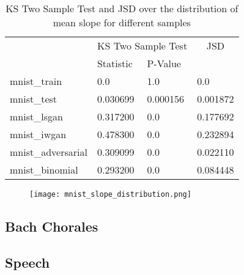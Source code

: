 \begin{table}[!h]
\centering
\caption{KS Two Sample Test and JSD over the distribution of mean slope for
different samples}
\label{tbl:mnist_slope}
\begin{tabular}{l|ll|l|}
                   & \multicolumn{2}{c|}{\cellcolor[HTML]{C0C0C0}KS Two Sample Test} & \multicolumn{1}{c|}{\cellcolor[HTML]{C0C0C0}JSD} \\
                   & Statistic   & P-Value    &            \\
mnist\_train       & 0.0         & 1.0        & 0.0        \\
mnist\_test        & 0.030699    & 0.000156   & 0.001872   \\
mnist\_lsgan       & 0.317200    & 0.0        & 0.177692   \\
mnist\_iwgan       & 0.478300    & 0.0        & 0.232894   \\
mnist\_adversarial & 0.309099    & 0.0        & 0.022110   \\
mnist\_binomial    & 0.293200    & 0.0        & 0.084448   
\end{tabular}
\end{table}

\begin{figure}
  \texttt{[image: mnist\_slope\_distribution.png]}
  \caption{}
  \label{fig:mnist_slope_distribution}
\end{figure}

\subsection{Bach Chorales}
\subsection{Speech}
